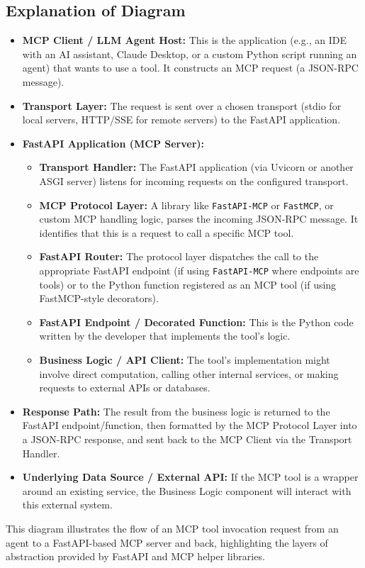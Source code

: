 \subsection*{Explanation of Diagram}
\begin{itemize}
    \item \textbf{MCP Client / LLM Agent Host:} This is the application (e.g., an IDE with an AI assistant, Claude Desktop, or a custom Python 
    script running an agent) that wants to use a tool. It constructs an MCP request (a JSON-RPC message).
    \item \textbf{Transport Layer:} The request is sent over a chosen transport (stdio for local servers, HTTP/SSE for remote servers) to the FastAPI application.
    \item \textbf{FastAPI Application (MCP Server):}
    \begin{itemize}
        \item \textbf{Transport Handler:} The FastAPI application (via Uvicorn or another ASGI server) listens for incoming requests on the configured transport.
        \item \textbf{MCP Protocol Layer:} A library like \texttt{FastAPI-MCP} or \texttt{FastMCP}, or custom MCP handling logic, 
        parses the incoming JSON-RPC message. It identifies that this is a request to call a specific MCP tool.
        \item \textbf{FastAPI Router:} The protocol layer dispatches the call to the appropriate FastAPI endpoint 
        (if using \texttt{FastAPI-MCP} where endpoints are tools) or to the Python function registered as an MCP tool (if using FastMCP-style decorators).
        \item \textbf{FastAPI Endpoint / Decorated Function:} This is the Python code written by the developer that implements the tool's logic.
        \item \textbf{Business Logic / API Client:} The tool's implementation might involve direct computation, calling other internal services,
         or making requests to external APIs or databases.
    \end{itemize}
    \item \textbf{Response Path:} The result from the business logic is returned to the FastAPI endpoint/function, then formatted by the 
    MCP Protocol Layer into a JSON-RPC response, and sent back to the MCP Client via the Transport Handler.
    \item \textbf{Underlying Data Source / External API:} If the MCP tool is a wrapper around an existing service, the Business 
    Logic component will interact with this external system.
\end{itemize}
This diagram illustrates the flow of an MCP tool invocation request from an agent to a FastAPI-based MCP server and back, highlighting 
the layers of abstraction provided by FastAPI and MCP helper libraries.

